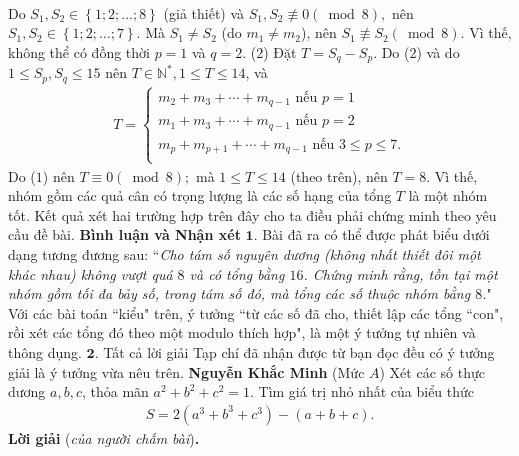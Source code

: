 \begin{multicols}{2}
\begin{align*}
	\end{align*}
	Do ${S_1},{S_2} \in \left\{ {1;2; \ldots ;8} \right\}$ (giả thiết) và  ${S_1},{S_2}\not  \equiv 0\left( {\bmod 8} \right),$ nên ${S_1},{S_2} \in \left\{ {1;2; \ldots ;7} \right\}.$  Mà $S_1 \ne S_2$  (do  $m_1 \ne m_2$), nên ${S_1}\not  \equiv {S_2}\left( {\bmod 8} \right).$  Vì thế, không thể có đồng thời $p = 1$ và $q = 2$. \hfill    ($2$)
	\vskip 0.05cm
	Đặt  $T = S_q - S_p$.
	\vskip 0.05cm
	Do ($2$) và do $1 \le {S_p},{S_q} \le 15$  nên \linebreak$T \in \mathbb{N^*}, 1 \le T \le 14$,    và
	\begin{align*}
	\!T\!=\!	\begin{cases}
			m_2 + m_3 + \cdots + m_{q-1} \text{ nếu } p=1 \\
			m_1 + m_3 + \cdots + m_{q-1} \text{ nếu } p=2 \\
			m_p \!+\! m_{p\!+\!1} \!+\! \cdots \!+\! m_{q-1} \text{ nếu } 3 \!\le\! p \!\le\! 7.\\
		\end{cases}
	\end{align*}
	Do ($1$) nên  $T \equiv 0\left( {\bmod 8} \right);$ mà $1 \le T \le 14$ (theo trên), nên $T = 8$. Vì thế, nhóm gồm các quả cân có trọng lượng là các số hạng của tổng $T$ là một nhóm tốt.
	\vskip 0.05cm
	Kết quả xét hai trường hợp trên đây cho ta điều phải chứng minh theo yêu cầu đề bài.
	\vskip 0.05cm
	\textbf{\color{thachthuctoanhoc}Bình luận và Nhận xét}
	\vskip 0.05cm
	$\pmb{1.}$ Bài đã ra có thể được phát biểu dưới dạng tương đương sau:
	\vskip 0.05cm
	``\textit{Cho tám số nguyên dương (không nhất thiết đôi một khác nhau) không vượt quá $8$ và có tổng bằng $16$. Chứng minh rằng, tồn tại một nhóm gồm tối đa bảy số, trong tám số đó, mà tổng các số thuộc nhóm bằng $8$.}"
	\vskip 0.05cm
	Với các bài toán ``kiểu" trên, ý tưởng ``từ các số đã cho, thiết lập các tổng ``con", rồi xét các tổng đó theo một modulo thích hợp", là một ý tưởng tự nhiên và thông dụng.
	\vskip 0.05cm
	$\pmb{2.}$ Tất cả lời giải Tạp chí đã nhận được từ bạn đọc đều có ý tưởng giải là ý tưởng vừa nêu trên.
	\vskip 0.05cm
	\hfill	\textbf{\color{thachthuctoanhoc}Nguyễn Khắc Minh}
	\vskip 0.05cm
	{}
	(Mức $A$) Xét các số thực dương $a, b, c$, thỏa mãn $a^2 + b^2 + c^2 =1$.  Tìm giá trị nhỏ nhất của biểu thức
	\begin{align*}
		S = 2\left( {{a^3} + {b^3} + {c^3}} \right) - \left( {a + b + c} \right).
	\end{align*}
	\textbf{\color{thachthuctoanhoc}Lời giải} (\textit{của người chấm bài})\textbf{\color{thachthuctoanhoc}.}

\end{multicols}

